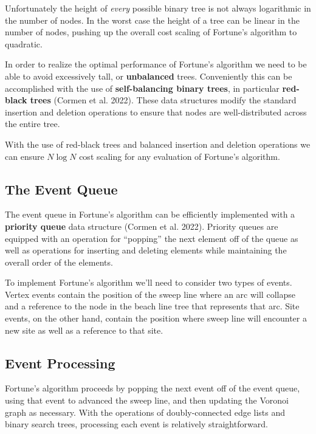 \documentclass[
  letterpaper,
  DIV=11,
  numbers=noendperiod]{scrartcl}
\begin{document}
Unfortunately the height of \emph{every} possible binary tree is not
always logarithmic in the number of nodes. In the worst case the height
of a tree can be linear in the number of nodes, pushing up the overall
cost scaling of Fortune's algorithm to quadratic.

In order to realize the optimal performance of Fortune's algorithm we
need to be able to avoid excessively tall, or \textbf{unbalanced} trees.
Conveniently this can be accomplished with the use of
\textbf{self-balancing binary trees}, in particular \textbf{red-black
trees} (Cormen et al. 2022). These data structures modify the standard
insertion and deletion operations to ensure that nodes are
well-distributed across the entire tree.

With the use of red-black trees and balanced insertion and deletion
operations we can ensure \(N \log N\) cost scaling for any evaluation of
Fortune's algorithm.

\subsection{The Event Queue}\label{the-event-queue}

The event queue in Fortune's algorithm can be efficiently implemented
with a \textbf{priority queue} data structure (Cormen et al. 2022).
Priority queues are equipped with an operation for ``popping'' the next
element off of the queue as well as operations for inserting and
deleting elements while maintaining the overall order of the elements.

To implement Fortune's algorithm we'll need to consider two types of
events. Vertex events contain the position of the sweep line where an
arc will collapse and a reference to the node in the beach line tree
that represents that arc. Site events, on the other hand, contain the
position where sweep line will encounter a new site as well as a
reference to that site.

\subsection{Event Processing}\label{event-processing}

Fortune's algorithm proceeds by popping the next event off of the event
queue, using that event to advanced the sweep line, and then updating
the Voronoi graph as necessary. With the operations of doubly-connected
edge lists and binary search trees, processing each event is relatively
straightforward.
\end{document}
